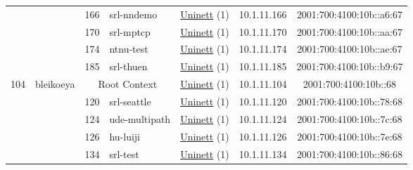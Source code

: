 \begin{small}
\begin{center}
\begin{longtable}{|c|c|c|c|c|c|c|c|}
  &  & \tiny{166} & \multicolumn{1}{|l|}{\tiny{srl-nndemo}} & \multicolumn{2}{|c|}{\tiny{\href{https://www.uninett.no}{Uninett} (1)}} & \tiny{10.1.11.166} & \tiny{2001:700:4100:10b::a6:67} \\* \cline{3-3}\cline{4-4}\cline{5-5}\cline{6-6}\cline{7-7}\cline{8-8}
  &  & \tiny{170} & \multicolumn{1}{|l|}{\tiny{srl-mptcp}} & \multicolumn{2}{|c|}{\tiny{\href{https://www.uninett.no}{Uninett} (1)}} & \tiny{10.1.11.170} & \tiny{2001:700:4100:10b::aa:67} \\* \cline{3-3}\cline{4-4}\cline{5-5}\cline{6-6}\cline{7-7}\cline{8-8}
  &  & \tiny{174} & \multicolumn{1}{|l|}{\tiny{ntnu-test}} & \multicolumn{2}{|c|}{\tiny{\href{https://www.uninett.no}{Uninett} (1)}} & \tiny{10.1.11.174} & \tiny{2001:700:4100:10b::ae:67} \\* \cline{3-3}\cline{4-4}\cline{5-5}\cline{6-6}\cline{7-7}\cline{8-8}
  &  & \tiny{185} & \multicolumn{1}{|l|}{\tiny{srl-thuen}} & \multicolumn{2}{|c|}{\tiny{\href{https://www.uninett.no}{Uninett} (1)}} & \tiny{10.1.11.185} & \tiny{2001:700:4100:10b::b9:67} \\ \hline
 \multirow{10}{*}{\tiny{104}} & \multicolumn{1}{|l|}{\multirow{10}{*}{\tiny{bleikoeya}}} & \multicolumn{2}{|c|}{\tiny{Root Context}} & \multicolumn{2}{|c|}{\tiny{\href{https://www.uninett.no}{Uninett} (1)}} & \tiny{10.1.11.104} & \tiny{2001:700:4100:10b::68} \\* \cline{3-3}\cline{4-4}\cline{5-5}\cline{6-6}\cline{7-7}\cline{8-8}
  &  & \tiny{120} & \multicolumn{1}{|l|}{\tiny{srl-seattle}} & \multicolumn{2}{|c|}{\tiny{\href{https://www.uninett.no}{Uninett} (1)}} & \tiny{10.1.11.120} & \tiny{2001:700:4100:10b::78:68} \\* \cline{3-3}\cline{4-4}\cline{5-5}\cline{6-6}\cline{7-7}\cline{8-8}
  &  & \tiny{124} & \multicolumn{1}{|l|}{\tiny{ude-multipath}} & \multicolumn{2}{|c|}{\tiny{\href{https://www.uninett.no}{Uninett} (1)}} & \tiny{10.1.11.124} & \tiny{2001:700:4100:10b::7c:68} \\* \cline{3-3}\cline{4-4}\cline{5-5}\cline{6-6}\cline{7-7}\cline{8-8}
  &  & \tiny{126} & \multicolumn{1}{|l|}{\tiny{hu-luiji}} & \multicolumn{2}{|c|}{\tiny{\href{https://www.uninett.no}{Uninett} (1)}} & \tiny{10.1.11.126} & \tiny{2001:700:4100:10b::7e:68} \\* \cline{3-3}\cline{4-4}\cline{5-5}\cline{6-6}\cline{7-7}\cline{8-8}
  &  & \tiny{134} & \multicolumn{1}{|l|}{\tiny{srl-test}} & \multicolumn{2}{|c|}{\tiny{\href{https://www.uninett.no}{Uninett} (1)}} & \tiny{10.1.11.134} & \tiny{2001:700:4100:10b::86:68} \\* \cline{3-3}\cline{4-4}\cline{5-5}\cline{6-6}\cline{7-7}\cline{8-8}

\end{longtable}
\end{center}
\end{small}
